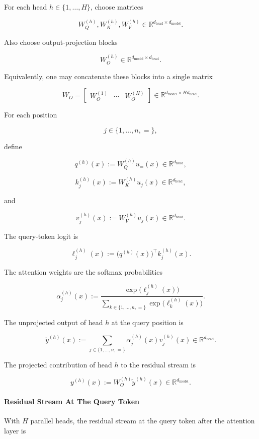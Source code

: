 \documentclass{article}
\theoremstyle{definition}
\theoremstyle{plain}
\begin{document}
\begin{sourcebox}
For each head $h \in \lbrace 1, \ldots, H\rbrace$, choose matrices

\[W_Q^{(h)}, W_K^{(h)}, W_V^{(h)} \in \mathbb{R}^{d_{\mathrm{head}} \times d_{\mathrm{model}}}.\]

Also choose output-projection blocks

\[W_O^{(h)} \in \mathbb{R}^{d_{\mathrm{model}} \times d_{\mathrm{head}}}.\]

Equivalently, one may concatenate these blocks into a single matrix

\[W_O = \begin{bmatrix} W_O^{(1)} & \cdots & W_O^{(H)} \end{bmatrix} \in \mathbb{R}^{d_{\mathrm{model}} \times H d_{\mathrm{head}}}.\]

For each position

\[j \in \lbrace 1, \ldots, n, =\rbrace,\]

define

\[q^{(h)}(x) := W_Q^{(h)} u_=(x) \in \mathbb{R}^{d_{\mathrm{head}}},\]

\[k_j^{(h)}(x) := W_K^{(h)} u_j(x) \in \mathbb{R}^{d_{\mathrm{head}}},\]

and

\[v_j^{(h)}(x) := W_V^{(h)} u_j(x) \in \mathbb{R}^{d_{\mathrm{head}}}.\]

The query-token logit is

\[\ell_j^{(h)}(x) := \bigl(q^{(h)}(x)\bigr)^\top k_j^{(h)}(x).\]

The attention weights are the softmax probabilities

\[\alpha_j^{(h)}(x) := \frac{\exp\bigl(\ell_j^{(h)}(x)\bigr)}{\sum_{k \in \lbrace 1,\ldots,n,=\rbrace} \exp\bigl(\ell_k^{(h)}(x)\bigr)}.\]

The unprojected output of head $h$ at the query position is

\[\widetilde y^{(h)}(x) := \sum_{j \in \lbrace 1,\ldots,n,=\rbrace} \alpha_j^{(h)}(x) v_j^{(h)}(x) \in \mathbb{R}^{d_{\mathrm{head}}}.\]

The projected contribution of head $h$ to the residual stream is

\[y^{(h)}(x) := W_O^{(h)} \widetilde y^{(h)}(x) \in \mathbb{R}^{d_{\mathrm{model}}}.\]

\paragraph{Residual Stream At The Query Token}

With $H$ parallel heads, the residual stream at the query token after the attention layer is


\end{sourcebox}
\end{document}
